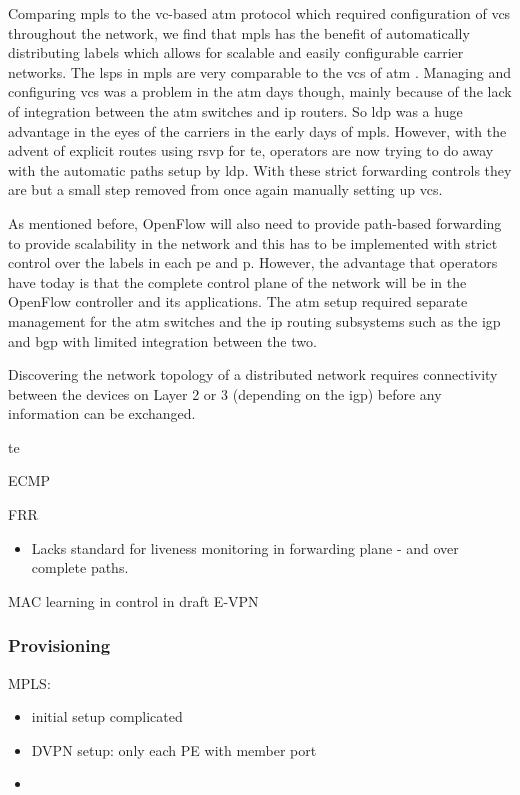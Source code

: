 Comparing \ac{mpls} to the \ac{vc}-based \ac{atm} protocol which required configuration of \acp{vc} throughout the network, we find that \ac{mpls} has the benefit of automatically distributing labels which allows for scalable and easily configurable carrier networks. The \acp{lsp} in \ac{mpls} are very comparable to the \acp{vc} of \ac{atm} \cite{mpls-tunnels}. Managing and configuring \acp{vc} was a problem in the \ac{atm} days though, mainly because of the lack of integration between the \ac{atm} switches and \ac{ip} routers. So \ac{ldp} was a huge advantage in the eyes of the carriers in the early days of \ac{mpls}. However, with the advent of explicit routes using \ac{rsvp} for \acl{te}, operators are now trying to do away with the automatic paths setup by \ac{ldp}. With these strict forwarding controls they are but a small step removed from once again manually setting up \acp{vc}. 

As mentioned before, OpenFlow will also need to provide path-based forwarding to provide scalability in the network and this has to be implemented with strict control over the labels in each \ac{pe} and \ac{p}. However, the advantage that operators have today is that the complete control plane of the network will be in the OpenFlow controller and its applications. The \ac{atm} setup required separate management for the \ac{atm} switches and the \ac{ip} routing subsystems such as the \ac{igp} and \ac{bgp} with limited integration between the two.

Discovering the network topology of a distributed network requires connectivity between the devices on Layer 2 or 3 (depending on the \ac{igp}) before any information can be exchanged. 

\acl{te} 

ECMP

FRR
\begin{itemize}
	\item Lacks standard for liveness monitoring in forwarding plane - and over complete paths.
\end{itemize}

MAC learning in control in draft E-VPN



\subsubsection{Provisioning} %
\label{ssub:provisioning}

MPLS:
\begin{itemize}
	\item initial setup complicated
	\item DVPN setup: only each PE with member port
	\item 
\end{itemize}

